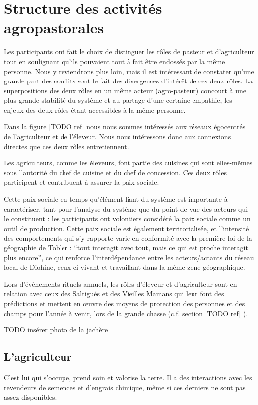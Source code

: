\section{Structure des activités agropastorales} 

Les participants ont fait le choix de distinguer les rôles de pasteur et d'agriculteur tout en soulignant qu'ils pouvaient tout à fait être endossés par la même personne. Nous y reviendrons plus loin, mais il est intéressant de constater qu'une grande part des conflits sont le fait des divergences d'intérêt de ces deux rôles. La superpositions des deux rôles en un même acteur (agro-pasteur) concourt à une plus grande stabilité du système et au partage d'une certaine empathie, les enjeux des deux rôles étant accessibles à la même personne.

Dans la figure [TODO ref] nous nous sommes intéressés aux réseaux égocentrés de l'agriculteur et de l'éleveur. Nous nous intéressons donc aux connexions directes que ces deux rôles entretiennent. 

Les agriculteurs, comme les éleveurs, font partie des cuisines qui sont elles-mêmes sous l'autorité du chef de cuisine et du chef de concession. Ces deux rôles participent et contribuent à assurer la paix sociale. 

Cette paix sociale en temps qu'élément liant du système est importante à caractériser, tant pour l'analyse du système que du point de vue des acteurs qui le constituent : les participants ont volontiers considéré la paix sociale comme un outil de production. Cette paix sociale est également territorialisée, et l'intensité des comportements qui s'y rapporte varie en conformité avec la première loi de la géographie de Tobler : “tout interagit avec tout, mais ce qui est proche interagit plus encore”, ce qui renforce l'interdépendance entre les acteurs/actants du réseau local de Diohine, ceux-ci vivant et travaillant dans la même zone géographique.

Lors d'évènements rituels annuels, les rôles d'éleveur et d'agriculteur sont en relation avec ceux des Saltigués et des Vieilles Mamans qui leur font des prédictions et mettent en œuvre des moyens de protection des personnes et des champs pour l'année à venir, lors de la grande chasse (c.f. section [TODO ref] ). 


TODO insérer photo de la jachère 

\subsection{L'agriculteur}
C'est lui qui s'occupe, prend soin et valorise la terre. Il a des interactions avec les revendeurs de semences et d'engrais chimique, même si ces derniers ne sont pas assez disponibles. 

